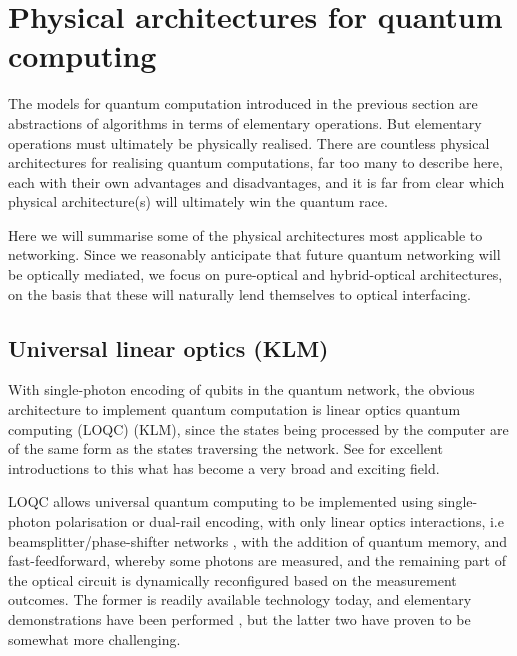 \documentclass[aps, rmp, twocolumn, amsmath, amssymb, nofootinbib, superscriptaddress, longbibliography, floatfix, table-of-contents, eqsecnum]{revtex4-1}
\begin{document}
%
%

\section{Physical architectures for quantum computing} \label{sec:archs_QC} 

The models for quantum computation introduced in the previous section are abstractions of algorithms in terms of elementary operations. But elementary operations must ultimately be physically realised. There are countless physical architectures for realising quantum computations, far too many to describe here, each with their own advantages and disadvantages, and it is far from clear which physical architecture(s) will ultimately win the quantum race.

Here we will summarise some of the physical architectures most applicable to networking. Since we reasonably anticipate that future quantum networking will be optically mediated, we focus on pure-optical and hybrid-optical architectures, on the basis that these will naturally lend themselves to optical interfacing.

%
%

\subsection{Universal linear optics (KLM)} \label{sec:KLM_univ} 

With single-photon encoding of qubits in the quantum network, the obvious architecture to implement quantum computation is linear optics quantum computing (LOQC) \cite{bib:KLM01} (KLM), since the states being processed by the computer are of the same form as the states traversing the network. See \cite{bib:Kok05, bib:KokLovettBook} for excellent introductions to this what has become a very broad and exciting field.

LOQC allows universal quantum computing to be implemented using single-photon polarisation or dual-rail encoding, with only linear optics interactions, i.e beamsplitter/phase-shifter networks \cite{bib:Reck94}, with the addition of quantum memory, and fast-feedforward, whereby some photons are measured, and the remaining part of the optical circuit is dynamically reconfigured based on the measurement outcomes. The former is readily available technology today, and elementary demonstrations have been performed \cite{bib:OBrien03, bib:UniversalLOOBrien}, but the latter two have proven to be somewhat more challenging.
\end{document}
